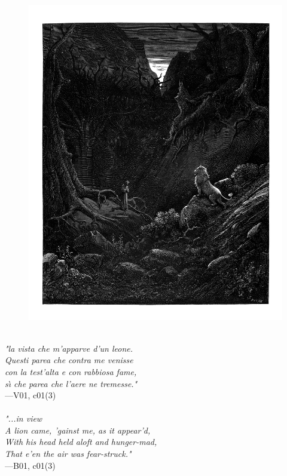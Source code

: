 \documentclass[../Dore_vision.tex]{subfiles}
\begin{document}
\begin{figure}[ht]
\centering
\includegraphics[height=\figsize]{illustrations/book_1/V01, c01(3).jpg}
\end{figure}

\begin{center}
\begin{minipage}{0.8\linewidth}
\textit{\\
"la vista che m’apparve d’un leone.\\Questi parea che contra me venisse\\con la test’alta e con rabbiosa fame,\\s\`{\i} che parea che l’aere ne tremesse."} \\
—V01, c01(3) \\~\\
\textit{"...in view\\A lion came, 'gainst me, as it appear'd,\\With his head held aloft and hunger-mad,\\That e'en the air was fear-struck."} \\
—B01, c01(3)
\end{minipage}
\end{center}
\end{document}
